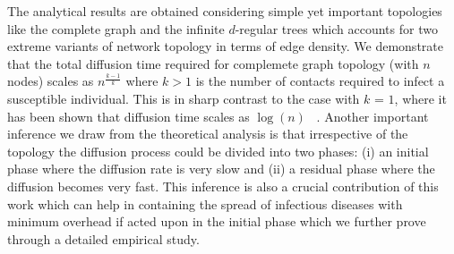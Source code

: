 The analytical results are obtained 
considering simple yet important topologies like the complete graph and the infinite $d$-regular trees which accounts for two extreme variants of network topology in terms of edge 
density. 
We demonstrate that the total diffusion time required for complemete graph topology (with $n$ nodes) scales as $n^{\frac{k-1}{k}}$ where $k>1$ is the number 
of contacts required to infect a susceptible individual. 
This is in sharp contrast to the case with $k$ = $1$, where it has been shown that diffusion time 
scales as $\log{(n)}$ ~\cite{rumarSreadingPushPull,rumourSpreading_evolvingGraph_PushPull}.
Another important inference we draw from the theoretical analysis is that irrespective of the topology the diffusion process could be divided into two phases: (i) an initial phase where the diffusion rate is very slow and 
(ii) a residual phase where the diffusion becomes very fast.
This inference is also a crucial contribution of this work which can help in containing 
the spread of infectious diseases with minimum overhead if acted upon in the initial phase which we further prove through a detailed empirical study.


\medskip
